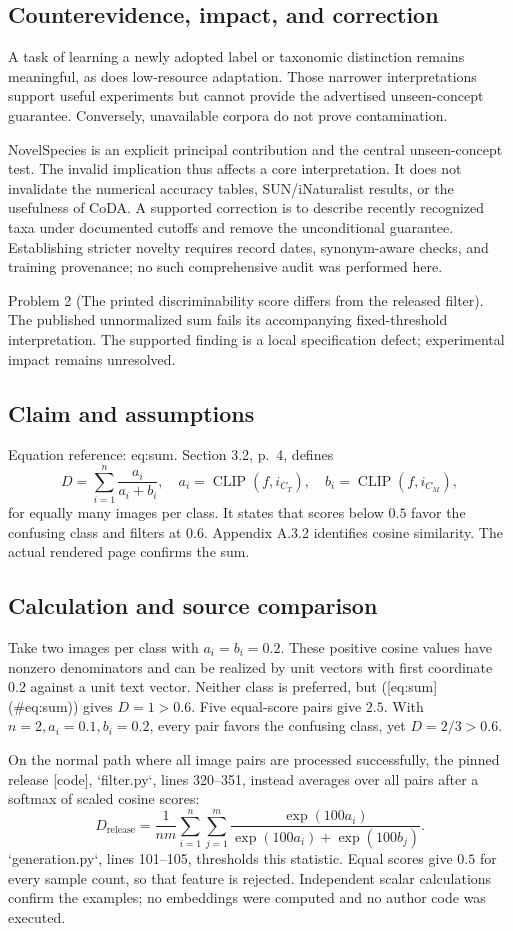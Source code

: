 \documentclass[10pt]{article}
\begin{document}
\subsection*{Counterevidence, impact, and correction}
A task of learning a newly adopted label or taxonomic distinction remains meaningful, as does low-resource adaptation. Those narrower interpretations support useful experiments but cannot provide the advertised unseen-concept guarantee. Conversely, unavailable corpora do not prove contamination.\par
NovelSpecies is an explicit principal contribution and the central unseen-concept test. The invalid implication thus affects a core interpretation. It does not invalidate the numerical accuracy tables, SUN/iNaturalist results, or the usefulness of CoDA. A supported correction is to describe recently recognized taxa under documented cutoffs and remove the unconditional guarantee. Establishing stricter novelty requires record dates, synonym-aware checks, and training provenance; no such comprehensive audit was performed here.\par
Problem 2 (The printed discriminability score differs from the released filter).  The published unnormalized sum fails its accompanying fixed-threshold interpretation. The supported finding is a local specification defect; experimental impact remains unresolved.\par
\subsection*{Claim and assumptions}
Equation reference: eq:sum. Section 3.2, p. 4, defines \[
D=\sum_{i=1}^{n}\frac{a_i}{a_i+b_i},
\quad a_i=\operatorname{CLIP}(f,i_{C_T}),\quad
b_i=\operatorname{CLIP}(f,i_{C_M}),\] for equally many images per class. It states that scores below \(0.5\) favor the confusing class and filters at \(0.6\). Appendix A.3.2 identifies cosine similarity. The actual rendered page confirms the sum.\par
\subsection*{Calculation and source comparison}
Take two images per class with \(a_i=b_i=0.2\). These positive cosine values have nonzero denominators and can be realized by unit vectors with first coordinate \(0.2\) against a unit text vector. Neither class is preferred, but ([eq:sum] (\#eq:sum)) gives \(D=1>0.6\). Five equal-score pairs give \(2.5\). With \(n=2,a_i=0.1,b_i=0.2\), every pair favors the confusing class, yet \(D=2/3>0.6\).\par
On the normal path where all image pairs are processed successfully, the pinned release [code], `filter.py`, lines 320–351, instead averages over all pairs after a softmax of scaled cosine scores: \[D_{\mathrm{release}}=\frac{1}{nm}\sum_{i=1}^{n}\sum_{j=1}^{m}
\frac{\exp(100a_i)}{\exp(100a_i)+\exp(100b_j)}.\] `generation.py`, lines 101–105, thresholds this statistic. Equal scores give \(0.5\) for every sample count, so that feature is rejected. Independent scalar calculations confirm the examples; no embeddings were computed and no author code was executed.\par
\end{document}

